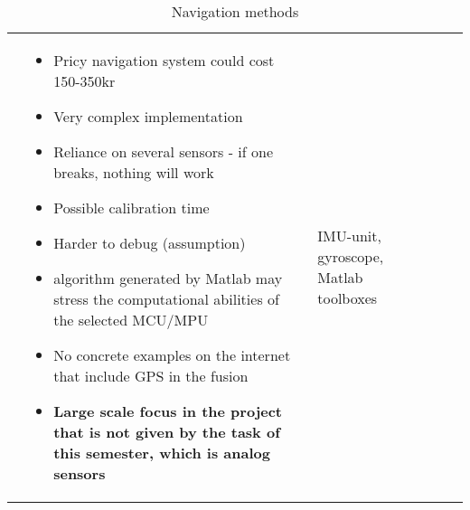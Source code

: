 \documentclass[../report.tex]{subfiles}
\begin{document}
\begin{table}[H]
\begin{tabularx}{\linewidth}{L|L|L|L|L}
\begin{itemize}
            \end{itemize}
            & 
            \begin{itemize}
                \item Pricy navigation system could cost 150-350kr
                \item Very complex implementation
                \item Reliance on several sensors - if one breaks, nothing will work
                \item Possible calibration time
                \item Harder to debug (assumption)
                \item algorithm generated by Matlab may stress the computational abilities of the selected MCU/MPU
                \item No concrete examples on the internet that include GPS in the fusion
                \item \textbf{Large scale focus in the project that is not given by the task of this semester, which is analog sensors}
            \end{itemize}
            & IMU-unit, gyroscope, Matlab toolboxes
               
              
        \end{tabularx}
    \caption{Navigation methods}
    \label{tab:my_label}
\end{table}
    
\end{document}
